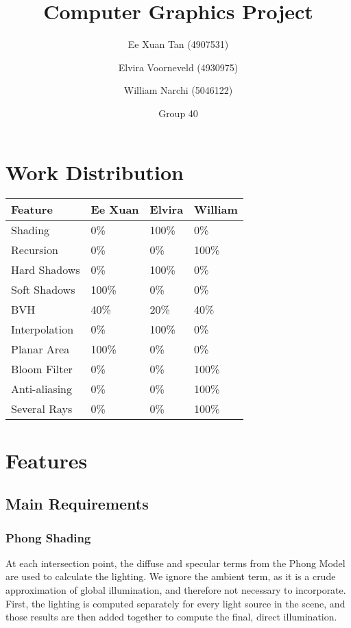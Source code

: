 \documentclass{article}
\author{Ee Xuan Tan (4907531) \and Elvira Voorneveld (4930975) \and William Narchi (5046122)}
\date{Group 40}
\title{Computer Graphics Project}
\begin{document}
    \maketitle

    \section{Work Distribution}
    \begin{tabular}{ |p{2.5cm}||p{2.5cm}|p{2.5cm}|p{2.5cm}| }
        \hline
        \textbf{Feature} &\textbf{Ee Xuan} &\textbf{Elvira} &\textbf{William}\\
        \hline
        Shading                        &0\%    &100\%  &0\%\\
        Recursion                      &0\%    &0\%    &100\%\\
        Hard Shadows                   &0\%    &100\%  &0\%\\
        Soft Shadows                   &100\%  &0\%    &0\%\\
        BVH                            &40\%   &20\%   &40\%\\
        Interpolation                  &0\%    &100\%  &0\%\\
        Planar Area                    &100\%  &0\%    &0\%\\
        Bloom Filter                   &0\%    &0\%    &100\%\\
        Anti-aliasing                  &0\%    &0\%    &100\%\\
        Several Rays                   &0\%    &0\%    &100\%\\
        \hline
    \end{tabular}

    \section{Features}
    \subsection{Main Requirements}
    \subsubsection{Phong Shading}
    At each intersection point, the diffuse and specular terms from the Phong Model are used to calculate the 
    lighting. We ignore the ambient term, as it is a crude approximation of global illumination, and therefore 
    not necessary to incorporate. First, the lighting is computed separately for every light source in the 
    scene, and those results are then added together to compute the final, direct illumination.
\end{document}
